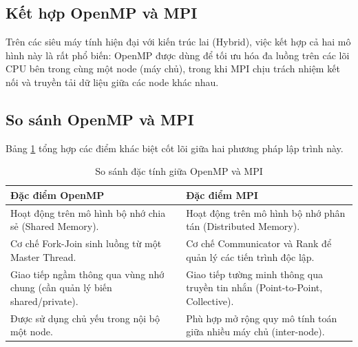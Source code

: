 \subsection{Kết hợp OpenMP và MPI}
Trên các siêu máy tính hiện đại với kiến trúc lai (Hybrid), việc kết hợp cả hai mô hình này là rất phổ biến: OpenMP được dùng để tối ưu hóa đa luồng trên các lõi CPU bên trong cùng một node (máy chủ), trong khi MPI chịu trách nhiệm kết nối và truyền tải dữ liệu giữa các node khác nhau.

\subsection{So sánh OpenMP và MPI}
Bảng \ref{tab:openmp_mpi} tổng hợp các điểm khác biệt cốt lõi giữa hai phương pháp lập trình này.

\begin{table}[H]
\centering
\caption{So sánh đặc tính giữa OpenMP và MPI}
\label{tab:openmp_mpi}
\begin{tabularx}{\textwidth}{|X|X|}
\hline
\textbf{Đặc điểm OpenMP} & \textbf{Đặc điểm MPI} \\
\hline
Hoạt động trên mô hình bộ nhớ chia sẻ (Shared Memory). & Hoạt động trên mô hình bộ nhớ phân tán (Distributed Memory). \\
\hline
Cơ chế Fork-Join sinh luồng từ một Master Thread. & Cơ chế Communicator và Rank để quản lý các tiến trình độc lập. \\
\hline
Giao tiếp ngầm thông qua vùng nhớ chung (cần quản lý biến shared/private). & Giao tiếp tường minh thông qua truyền tin nhắn (Point-to-Point, Collective). \\
\hline
Được sử dụng chủ yếu trong nội bộ một node. & Phù hợp mở rộng quy mô tính toán giữa nhiều máy chủ (inter-node). \\
\hline
\end{tabularx}
\end{table}